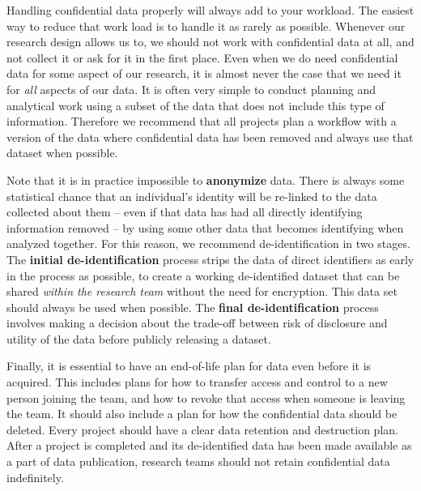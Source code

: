 {Handling confidential data properly will always add to your workload.
The easiest way to reduce that work load is to
handle it as rarely as possible.
Whenever our research design allows us to,
we should not work with confidential data at all,
and not collect it or ask for it in the first place.
Even when we do need confidential data for some aspect of our research,
it is almost never the case that we need it for \textit{all} aspects of our data.
It is often very simple to conduct planning and analytical work
using a subset of the data that does not include this type of information.
Therefore we recommend that all projects plan a workflow
with a version of the data where confidential data has been removed
and always use that dataset when possible.

Note that it is in practice impossible
to \textbf{anonymize} data.
There is always some statistical chance that an individual's identity
will be re-linked to the data collected about them
-- even if that data has had all directly identifying information removed --
by using some other data that becomes identifying when analyzed together.
For this reason, we recommend de-identification in two stages.
The \textbf{initial de-identification} process strips the data of direct identifiers
as early in the process as possible,
to create a working de-identified dataset that
can be shared \textit{within the research team} without the need for encryption.
This data set should always be used when possible.
The \textbf{final de-identification} process involves
making a decision about the trade-off between
risk of disclosure and utility of the data
before publicly releasing a dataset.

Finally, it is essential to have an end-of-life plan for data even before it is acquired.
This includes plans for how to transfer access and control to a new person joining the team,
and how to revoke that access when someone is leaving the team.
It should also include a plan for how the confidential data should be deleted.
Every project should have a clear data retention and destruction plan.
After a project is completed and its
de-identified data has been made available as a part of data publication,
research teams should not retain confidential data indefinitely.

}
